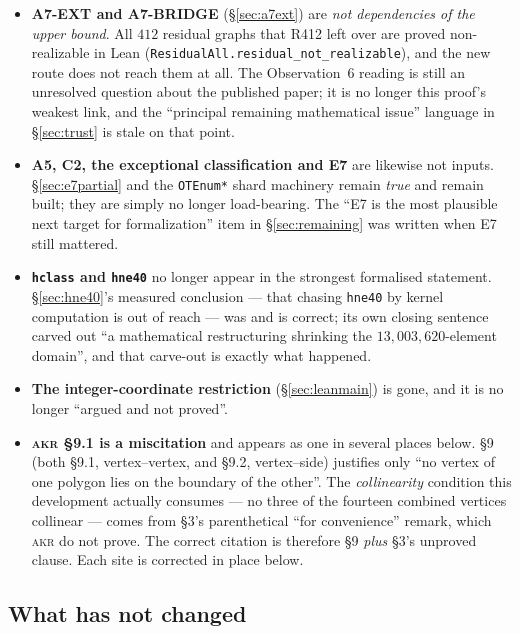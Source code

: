 \documentclass[11pt,a4paper]{article}
\theoremstyle{plain}
\theoremstyle{definition}
\theoremstyle{remark}
\begin{document}
\begin{itemize}[leftmargin=*]
  \item \textbf{\textsf{A7-EXT} and \textsf{A7-BRIDGE}} (\S\ref{sec:a7ext}) are
    \emph{not dependencies of the upper bound}. All $412$ residual graphs that
    \textsf{R412} left over are proved non-realizable in Lean
    (\texttt{ResidualAll.residual\_not\_realizable}), and the new route does not
    reach them at all. The Observation~6 reading is still an unresolved question
    about the published paper; it is no longer this proof's weakest link, and
    the ``principal remaining mathematical issue'' language in
    \S\ref{sec:trust} is stale on that point.
  \item \textbf{\textsf{A5}, \textsf{C2}, the exceptional classification and
    \textsf{E7}} are likewise not inputs. \S\ref{sec:e7partial} and the
    \texttt{OTEnum*} shard machinery remain \emph{true} and remain built; they
    are simply no longer load-bearing. The ``\textsf{E7} is the most plausible
    next target for formalization'' item in \S\ref{sec:remaining} was written
    when \textsf{E7} still mattered.
  \item \textbf{\texttt{hclass} and \texttt{hne40}} no longer appear in the
    strongest formalised statement. \S\ref{sec:hne40}'s measured conclusion ---
    that chasing \texttt{hne40} by kernel computation is out of reach --- was and
    is correct; its own closing sentence carved out ``a mathematical
    restructuring shrinking the $13{,}003{,}620$-element domain'', and that
    carve-out is exactly what happened.
  \item \textbf{The integer-coordinate restriction} (\S\ref{sec:leanmain}) is
    gone, and it is no longer ``argued and not proved''.
  \item \textbf{\textsc{akr} \S9.1 is a miscitation} and appears as one in
    several places below. \S9 (both \S9.1, vertex--vertex, and \S9.2,
    vertex--side) justifies only ``no vertex of one polygon lies on the boundary
    of the other''. The \emph{collinearity} condition this development actually
    consumes --- no three of the fourteen combined vertices collinear --- comes
    from \S3's parenthetical ``for convenience'' remark, which \textsc{akr} do
    not prove. The correct citation is therefore \S9 \emph{plus} \S3's unproved
    clause. Each site is corrected in place below.
\end{itemize}

\subsection*{What has not changed}
\end{document}
